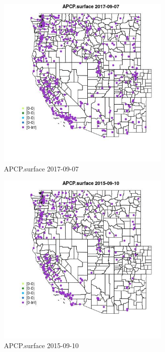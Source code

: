\begin{figure} 
\centering  
\includegraphics[width=0.77\textwidth]{Code_Outputs/Report_ML_input_PM25_Step4_part_e_de_duplicated_aves_compiled_2019-05-20wNAs_MapObsAPCPsurface2017-09-07.jpg} 
\caption{\label{fig:Report_ML_input_PM25_Step4_part_e_de_duplicated_aves_compiled_2019-05-20wNAsMapObsAPCPsurface2017-09-07}APCP.surface 2017-09-07} 
\end{figure} 
 

\clearpage 

\begin{figure} 
\centering  
\includegraphics[width=0.77\textwidth]{Code_Outputs/Report_ML_input_PM25_Step4_part_e_de_duplicated_aves_compiled_2019-05-20wNAs_MapObsAPCPsurface2015-09-10.jpg} 
\caption{\label{fig:Report_ML_input_PM25_Step4_part_e_de_duplicated_aves_compiled_2019-05-20wNAsMapObsAPCPsurface2015-09-10}APCP.surface 2015-09-10} 
\end{figure} 
 

